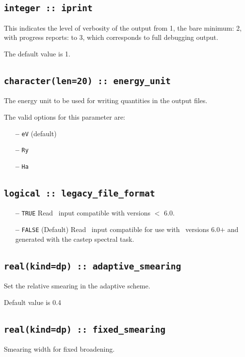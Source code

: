 \documentclass[a4paper,11pt,twoside]{book}
\begin{document}
{\subsection[iprint]{\tt integer :: iprint}

This indicates the level of verbosity of the output from 1,
the bare minimum: 2, with progress reports: to 3, which corresponds to full debugging output.

The default value is 1.


\subsection[energy\_unit]{\tt character(len=20) :: energy\_unit}
The energy unit to be used for writing quantities in the output files.

The valid options for this parameter are:
\begin{itemize}
\item[{\bf --}]  \verb#eV# (default)
\item[{\bf --}]  \verb#Ry#
\item[{\bf --}]  \verb#Ha#
\end{itemize}

\subsection[adaptive\_smearing]{\tt logical :: legacy\_file\_format}
\label{sect:lff}
\begin{itemize}
\item[{\bf --}] \verb#TRUE#  Read \castep\ input compatible with versions $<$ 6.0.
\item[{\bf --}] \verb#FALSE# (Default) Read \castep\ input compatible for use with \castep\ versions 6.0$+$ and generated with the castep spectral task.
\end{itemize}

\subsection[adaptive\_smearing]{\tt real(kind=dp) :: adaptive\_smearing}
Set the relative smearing in the adaptive scheme.

Default value is 0.4

\subsection[fixed\_smearing]{\tt real(kind=dp) :: fixed\_smearing}
Smearing width for fixed broadening.

}
\end{document}
